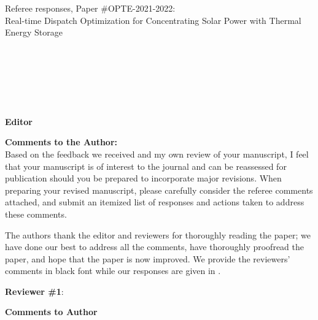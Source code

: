 \documentclass[10pt]{article}
\begin{document}
\begin{center}
{\Large Referee responses, Paper \#OPTE-2021-2022:\\ Real-time Dispatch Optimization for Concentrating Solar Power with Thermal
Energy Storage}
\end{center}

\bigskip



\noindent
{}\\
\\
\\
\\
\\

\bigskip

{\bf  Editor}


{\bf Comments to the Author:}\\

Based on the feedback we received and my own review of your manuscript, I feel
that your manuscript is of interest to the journal and can be reassessed for
publication should you be prepared to incorporate major revisions. When
preparing your revised manuscript, please carefully consider the referee
comments attached, and submit an itemized list of responses and actions taken
to address these comments.

\noindent \hrulefill \vspace{-.05cm}

\noindent

The authors thank the editor and reviewers for thoroughly reading the paper; we have done our best to address all the comments, have thoroughly proofread the paper, and hope that the paper is now improved. We provide the reviewers' comments in black font while our responses are given in . 

\noindent \hrulefill \vspace{-.05cm}
\bigskip


{\bf Reviewer \#1}:

{\bf Comments to Author}\\
\end{document}
